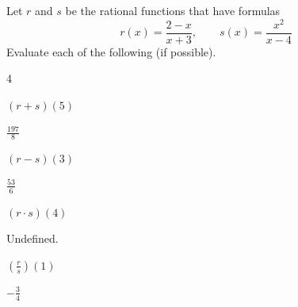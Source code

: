 \begin{exercises}
	 \begin{problem}
	 Let $r$ and $s$ be the rational functions that have formulas
	 \[
		 r(x)=\frac{2-x}{x+3}, \qquad s(x)=\frac{x^2}{x-4}
	 \]
	 Evaluate each of the following (if possible).
	 \begin{multicols}{4}
		 \begin{subproblem}
			 $(r+s)(5)$
			 \begin{shortsolution}
				 $\frac{197}{8}$
			 \end{shortsolution}
		 \end{subproblem}
		 \begin{subproblem}
			 $(r-s)(3)$
			 \begin{shortsolution}
				 $\frac{53}{6}$
			 \end{shortsolution}
		 \end{subproblem}
		 \begin{subproblem}
			 $(r\cdot s)(4)$
			 \begin{shortsolution}
				 Undefined.
			 \end{shortsolution}
		 \end{subproblem}
		 \begin{subproblem}
			 $\left( \frac{r}{s} \right)(1)$
			 \begin{shortsolution}
				 $-\frac{3}{4}$
			 \end{shortsolution}
		 \end{subproblem}
	 \end{multicols}
	 \end{problem}



\end{exercises}
